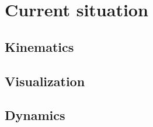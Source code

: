 \chapter{Current situation}

\section{Kinematics}
\lipsum[1]

\section{Visualization}
\lipsum[1]

\section{Dynamics}
\lipsum[1]